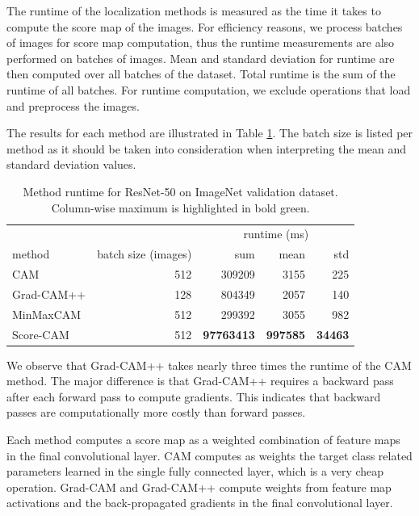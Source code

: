 The runtime of the localization methods is measured as the time it takes to compute the score map of the images. For efficiency reasons, we process batches of images for score map computation, thus the runtime measurements are also performed on batches of images. Mean and standard deviation for runtime are then computed over all batches of the dataset. Total runtime is the sum of the runtime of all batches. For runtime computation, we exclude operations that load and preprocess the images.

The results for each method are illustrated in Table \ref{tab:runtime_resnet50_imagenet}. The batch size is listed per method as it should be taken into consideration when interpreting the mean and standard deviation values.

\begin{table}[h]
\centering
\begin{tabular}{lrrrr}
\toprule
\multicolumn{2}{c}{} & \multicolumn{3}{c}{runtime (ms)} \\
method & batch size (images) & sum & mean & std \\
\cmidrule(lr){1-2} \cmidrule(lr){3-5}
CAM & 512 & 309209 & 3155 & 225 \\
Grad-CAM++ & 128 & 804349 & 2057 & 140 \\
MinMaxCAM & 512 & 299392 & 3055 & 982 \\
Score-CAM & 512 & \color{teal} \bfseries 97763413 & \color{teal} \bfseries 997585 & \color{teal} \bfseries 34463\\
\bottomrule
\end{tabular}
\caption[Method runtime for ResNet-50 on ImageNet validation dataset]{Method runtime for ResNet-50 on ImageNet validation dataset.  Column-wise maximum is highlighted in bold green.}
\label{tab:runtime_resnet50_imagenet}
\end{table}

We observe that Grad-CAM++ takes nearly three times the runtime of the CAM method. The major difference is that Grad-CAM++ requires a backward pass after each forward pass to compute gradients. This indicates that backward passes are computationally more costly than forward passes.

Each method computes a score map as a weighted combination of feature maps in the final convolutional layer. CAM computes as weights the target class related parameters learned in the single fully connected layer, which is a very cheap operation. Grad-CAM and Grad-CAM++ compute weights from feature map activations and the back-propagated gradients in the final convolutional layer.

